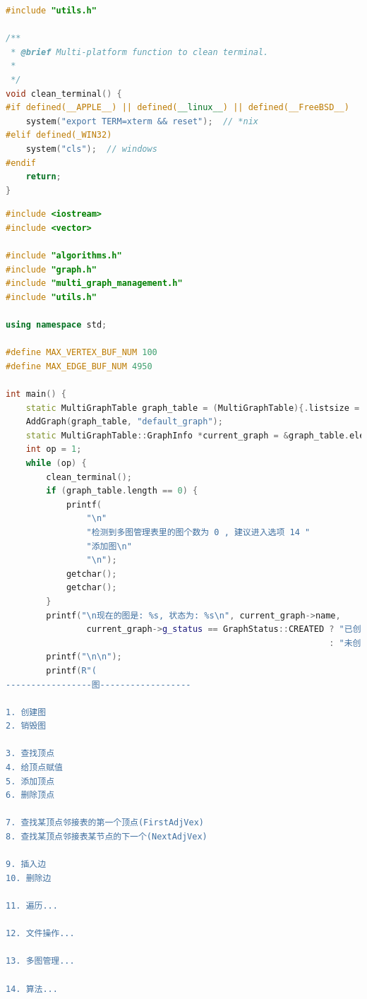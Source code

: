 \documentclass[supercite]{Experimental_Report}
\theoremstyle{definition}
\begin{document}
\begin{lstlisting}[caption={$utils.cpp$}, language=C++, frame=single]
#include "utils.h"

/**
 * @brief Multi-platform function to clean terminal.
 *
 */
void clean_terminal() {
#if defined(__APPLE__) || defined(__linux__) || defined(__FreeBSD__)
    system("export TERM=xterm && reset");  // *nix
#elif defined(_WIN32)
    system("cls");  // windows
#endif
    return;
}
\end{lstlisting}

\begin{lstlisting}[caption={$main.cpp$}, language=C++, frame=single]
#include <iostream>
#include <vector>

#include "algorithms.h"
#include "graph.h"
#include "multi_graph_management.h"
#include "utils.h"

using namespace std;

#define MAX_VERTEX_BUF_NUM 100
#define MAX_EDGE_BUF_NUM 4950

int main() {
	static MultiGraphTable graph_table = (MultiGraphTable){.listsize = 10};
	AddGraph(graph_table, "default_graph");
	static MultiGraphTable::GraphInfo *current_graph = &graph_table.elem[0];
	int op = 1;
	while (op) {
		clean_terminal();
		if (graph_table.length == 0) {
			printf(
				"\n"
				"检测到多图管理表里的图个数为 0 , 建议进入选项 14 "
				"添加图\n"
				"\n");
			getchar();
			getchar();
		}
		printf("\n现在的图是: %s, 状态为: %s\n", current_graph->name,
				current_graph->g_status == GraphStatus::CREATED ? "已创建"
																: "未创建");
		printf("\n\n");
		printf(R"(
-----------------图------------------

1. 创建图
2. 销毁图

3. 查找顶点
4. 给顶点赋值
5. 添加顶点
6. 删除顶点

7. 查找某顶点邻接表的第一个顶点(FirstAdjVex)
8. 查找某顶点邻接表某节点的下一个(NextAdjVex)

9. 插入边
10. 删除边

11. 遍历...

12. 文件操作...

13. 多图管理...

14. 算法...


\end{lstlisting}
\end{document}
